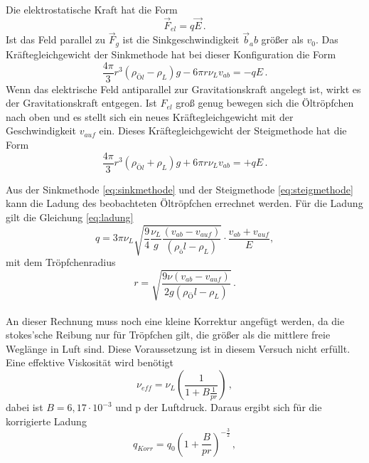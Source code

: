 Die elektrostatische Kraft hat die Form 
\begin{equation*}
    \vec{F}_{el} = q \vec{E}\, .
    \label{eq:Estat}
\end{equation*}
Ist das Feld parallel zu $\vec{F}_g$ ist die Sinkgeschwindigkeit $\vec{b}_ab$ größer als $v_0$.
Das Kräftegleichgewicht der Sinkmethode hat bei dieser Konfiguration die Form 
\begin{equation}
    \frac{4 \pi}{3} r^3(\rho_{Öl} - \rho_L)g - 6 \pi r \nu_L v_{ab} = - q E \, .
    \label{eq:sinkmethode}
\end{equation}
Wenn das elektrische Feld antiparallel zur Gravitationskraft angelegt ist, wirkt es der Gravitationskraft entgegen.
Ist $F_{el}$ groß genug bewegen sich die Öltröpfchen nach oben und es stellt sich ein neues Kräftegleichgewicht mit der Geschwindigkeit $v_{auf}$ ein.
Dieses Kräftegleichgewicht der Steigmethode hat die Form
\begin{equation}
    \frac{4 \pi}{3} r^3(\rho_{Öl} + \rho_L)g + 6 \pi r \nu_L v_{ab} = + q E \, .
    \label{eq:steigmethode}
\end{equation}

Aus der Sinkmethode \eqref{eq:sinkmethode} und der Steigmethode \eqref{eq:steigmethode} kann die Ladung des beobachteten Öltröpfchen errechnet werden.
Für die Ladung gilt die Gleichung \eqref{eq:ladung}
\begin{equation}
    q = 3 \pi \nu_L \sqrt{\frac{9}{4} \frac{\nu_L}{g} \frac{(v_{ab} - v_{auf})}{(\rho_öl - \rho_L)}} \cdot \frac{v_{ab}+ v_{auf}}{E} ,
    \label{eq:ladung}
\end{equation}
mit dem Tröpfchenradius 
\begin{equation}
    r = \sqrt{\frac{9 \nu (v_{ab}-v_{auf})}{2 g (\rho_Öl - \rho_L)}}\, .
    \label{eq:rmitEfled}
\end{equation} \\

An dieser Rechnung muss noch eine kleine Korrektur angefügt werden, da die stokes'sche Reibung nur für Tröpfchen gilt, die größer als die mittlere freie Weglänge in Luft sind.
Diese Voraussetzung ist in diesem Versuch nicht erfüllt. Eine effektive Viskosität wird benötigt
\begin{equation}
    \nu_{eff} = \nu_L \left( \frac{1}{1+ B \frac{1}{p r}}       \right) \, ,
    \label{eq:Veff}
\end{equation}
dabei ist $B = 6,17 \cdot 10^{-3} $ und p der Luftdruck. Daraus ergibt sich für die korrigierte Ladung
\begin{equation}
    q_{Korr} = q_0 (1 + \frac{B}{p r})^{-\frac{3}{2}}  \, ,
    \label{eq:qKorr}
\end{equation}
